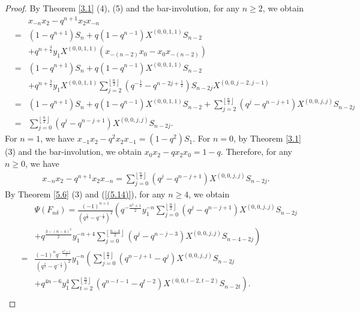 \documentclass[reqno,11pt]{amsart}
\numberwithin{equation}{section}
\begin{document}
\begin{proof}
	By Theorem \ref{3.1} (4), (5) and
	the bar-involution, for any $n\ge 2$, we obtain
	\begin{eqnarray*}
	&&x_{-n}x_2-q^{n+1}x_2x_{-n}\\
	&=&\left(1-q^{n+1}\right)S_n+q\left(1-q^{n-1}\right)X^{(0,0,1,1)}S_{n-2}\\
		&&+q^{n+\frac32}y_1X^{(0,0,1,1)}\left(x_{-(n-2)}x_0-x_0x_{-(n-2)}\right)\\
		&=&\left(1-q^{n+1}\right)S_n+q\left(1-q^{n-1}\right)X^{(0,0,1,1)}S_{n-2}\\
		&&+q^{n+\frac32}y_1X^{(0,0,1,1)}\sum\limits_{j=2}^{\left\lfloor\frac n2\right\rfloor}\left(q^{-\frac12}-q^{n-2j+\frac12}\right)S_{n-2j}X^{(0,0,j-2,j-1)}\\
		&=&\left(1-q^{n+1}\right)S_n+q\left(1-q^{n-1}\right)X^{(0,0,1,1)}S_{n-2}
		+\sum\limits_{j=2}^{\left\lfloor\frac n2\right\rfloor}\left(q^j-q^{n-j+1}\right)X^{(0,0,j,j)}S_{n-2j}\\
		&=&\sum\limits_{j=0}^{\left\lfloor\frac n2\right\rfloor}\left(q^j-q^{n-j+1}\right)X^{(0,0,j,j)}S_{n-2j}.
	\end{eqnarray*}	
\begingroup
	For $n=1$, we have $x_{-1}x_2-q^2x_2x_{-1}=(1-q^2)S_1.$ For $n=0$, by Theorem \ref{3.1} (3) and the bar-involution, we obtain $x_0x_2-qx_2x_0=1-q.$
	Therefore, for any $n\ge 0$, we have
	\begin{eqnarray}\label{(5.14)}
		x_{-n}x_2-q^{n+1}x_2x_{-n}=\sum\limits_{j=0}^{\left\lfloor\frac n2\right\rfloor}\left(q^j-q^{n-j+1}\right)X^{(0,0,j,j)}S_{n-2j}.
	\end{eqnarray}
	By Theorem \ref{5.6} (3) and (\ref{(5.14)}), for any $n\ge 4$, we obtain
\begin{eqnarray*}
		&&\Psi\left({{F_{n\delta}}}\right)=\frac{(-1)^{n+1}}{\left(q^{\frac12}-q^{-\frac12}\right)^2}\left(q^{-\frac{n^2+1}{2}}y_1^{-n}\sum\limits_{j=0}^{\left\lfloor\frac n2\right\rfloor}\left(q^j-q^{n-j+1}\right)X^{(0,0,j,j)}S_{n-2j}\right.\\
		&&\left.+q^{\frac{3-(n-4)^2}{2}}y_1^{-n+4}\sum\limits_{j=0}^{\left\lfloor\frac{n-4}{2}\right\rfloor}\left(q^j-q^{n-j-3}\right)X^{(0,0,j,j)}S_{n-4-2j}\right)\\
		&=&\frac{(-1)^nq^{-\frac{n^2+1}{2}}}{\left(q^{\frac12}-q^{-\frac12}\right)^2}y_1^{-n}\left(\sum\limits_{j=0}^{\left\lfloor\frac n2\right\rfloor}\left(q^{n-j+1}-q^j\right)X^{(0,0,j,j)}S_{n-2j}\right.\\
		&&\left.+q^{4n-6}y_1^4\sum\limits_{t=2}^{\left\lfloor\frac n2\right\rfloor}\left(q^{n-t-1}-q^{t-2}\right)X^{(0,0,t-2,t-2)}S_{n-2t}\right).\\

\end{eqnarray*}
\end{proof}
\end{document}

